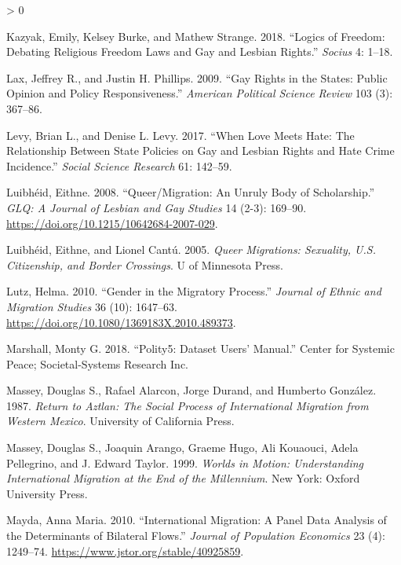 \documentclass[
  11pt,
]{article}
\newlength{\cslhangindent}
\newenvironment{CSLReferences}[2] %
 {%
  \setlength{\parindent}{0pt}
  \ifodd #1 \everypar{\setlength{\hangindent}{\cslhangindent}}\ignorespaces\fi
  \ifnum #2 > 0
  \setlength{\parskip}{#2\baselineskip}
  \fi
 }%
 {}
\begin{document}
\begin{CSLReferences}{1}{0}
\leavevmode\hypertarget{ref-kazyak_2018}{}%
Kazyak, Emily, Kelsey Burke, and Mathew Strange. 2018. {``Logics of {Freedom}: {Debating} {Religious} {Freedom} {Laws} and {Gay} and {Lesbian} {Rights}.''} \emph{Socius} 4: 1--18.

\leavevmode\hypertarget{ref-lax_2009}{}%
Lax, Jeffrey R., and Justin H. Phillips. 2009. {``Gay Rights in the States: {Public} Opinion and Policy Responsiveness.''} \emph{American Political Science Review} 103 (3): 367--86.

\leavevmode\hypertarget{ref-levy_2017}{}%
Levy, Brian L., and Denise L. Levy. 2017. {``When {Love} {Meets} {Hate}: {The} {Relationship} {Between} {State} {Policies} on {Gay} and {Lesbian} {Rights} and {Hate} {Crime} {Incidence}.''} \emph{Social Science Research} 61: 142--59.

\leavevmode\hypertarget{ref-luibheid_2008}{}%
Luibhéid, Eithne. 2008. {``Queer/{Migration}: {An} {Unruly} {Body} of {Scholarship}.''} \emph{GLQ: A Journal of Lesbian and Gay Studies} 14 (2-3): 169--90. \url{https://doi.org/10.1215/10642684-2007-029}.

\leavevmode\hypertarget{ref-luibheid_2005}{}%
Luibhéid, Eithne, and Lionel Cantú. 2005. \emph{Queer {Migrations}: {Sexuality}, {U}.{S}. {Citizenship}, and {Border} {Crossings}}. U of Minnesota Press.

\leavevmode\hypertarget{ref-lutz_2010}{}%
Lutz, Helma. 2010. {``Gender in the {Migratory} {Process}.''} \emph{Journal of Ethnic and Migration Studies} 36 (10): 1647--63. \url{https://doi.org/10.1080/1369183X.2010.489373}.

\leavevmode\hypertarget{ref-marshall_2018}{}%
Marshall, Monty G. 2018. {``Polity5: {Dataset} {Users}' {Manual}.''} Center for Systemic Peace; Societal-Systems Research Inc.

\leavevmode\hypertarget{ref-massey_1987}{}%
Massey, Douglas S., Rafael Alarcon, Jorge Durand, and Humberto González. 1987. \emph{Return to {Aztlan}: {The} {Social} {Process} of {International} {Migration} from {Western} {Mexico}}. University of California Press.

\leavevmode\hypertarget{ref-massey_1999}{}%
Massey, Douglas S., Joaquin Arango, Graeme Hugo, Ali Kouaouci, Adela Pellegrino, and J. Edward Taylor. 1999. \emph{Worlds in {Motion}: {Understanding} {International} {Migration} at the {End} of the {Millennium}}. New York: Oxford University Press.

\leavevmode\hypertarget{ref-mayda_2010}{}%
Mayda, Anna Maria. 2010. {``International Migration: A Panel Data Analysis of the Determinants of Bilateral Flows.''} \emph{Journal of Population Economics} 23 (4): 1249--74. \url{https://www.jstor.org/stable/40925859}.


\end{CSLReferences}
\end{document}
